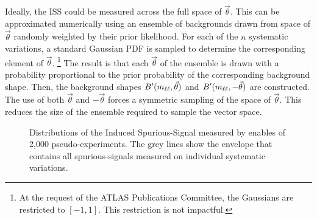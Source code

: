 Ideally, the ISS could be measured across the full space of $\vec{\theta}$.
This can be approximated numerically using an ensemble of backgrounds drawn from space of $\vec{\theta}$ randomly weighted by their prior likelihood.
For each of the $n$ systematic variations, a standard Gaussian PDF is sampled to determine the corresponding element of $\vec{\theta}$. \footnote{At the request of the ATLAS Publications Committee, the Gaussians are restricted to $[-1,1]$. This restriction is not impactful.}
The result is that each $\vec{\theta}$ of the ensemble is drawn with a probability proportional to the prior probability of the corresponding background shape.
Then, the background shapes $B'(m_{\ell\ell},\vec{\theta})$ and $B'(m_{\ell\ell},-\vec{\theta})$ are constructed.
The use of both $\vec{\theta}$ and $-\vec{\theta}$ forces a symmetric sampling of the space of $\vec{\theta}$. 
This reduces the size of the ensemble required to sample the vector space.

\begin{figure}[h!]
\captionsetup[subfigure]{position=b}
\centering
{}
\caption{Distributions of the Induced Spurious-Signal measured by enables of 2,000 pseudo-experiments. The grey lines show the envelope that contains all spurious-signals measured on individual systematic variations.}
\label{fig:ciBkgIssSyst}
\end{figure}

